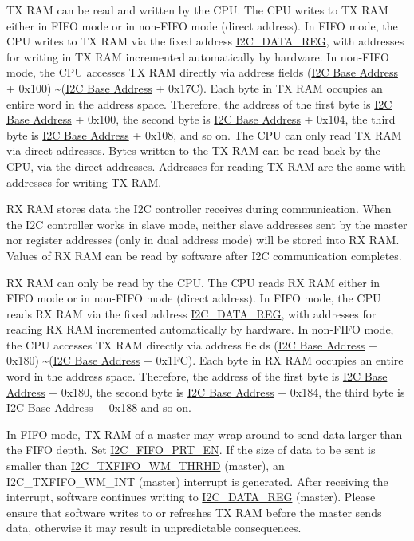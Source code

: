 \documentclass[main\_\_EN.tex]{subfiles}
\begin{document}
TX RAM can be read and written by the CPU. The CPU writes to TX RAM either in FIFO mode or in non-FIFO mode (direct address). In FIFO mode, the CPU writes to TX RAM via the fixed address \hyperref[regdesc:I2CDATAREG]{I2C\_DATA\_REG}, with addresses for writing in TX RAM incremented automatically by hardware. In non-FIFO mode, the CPU accesses TX RAM directly via address fields (\hyperref[tab:sysmem-base-address]{I2C Base Address} + 0x100) \textasciitilde (\hyperref[tab:sysmem-base-address]{I2C Base Address} + 0x17C). Each byte in TX RAM occupies an entire word in the address space. Therefore, the address of the first byte is \hyperref[tab:sysmem-base-address]{I2C Base Address} + 0x100, the second byte is \hyperref[tab:sysmem-base-address]{I2C Base Address} + 0x104, the third byte is \hyperref[tab:sysmem-base-address]{I2C Base Address} + 0x108, and so on. The CPU can only read TX RAM via direct addresses. Bytes written to the TX RAM can be read back by the CPU, via the direct addresses. Addresses for reading TX RAM are the same with addresses for writing TX RAM.

RX RAM stores data the I2C controller receives during communication. When the I2C controller works in slave mode, neither slave addresses sent by the master nor register addresses (only in dual address mode) will be stored into RX RAM. Values of RX RAM can be read by software after I2C communication completes.

RX RAM can only be read by the CPU. The CPU reads RX RAM either in FIFO mode or in non-FIFO mode (direct address). In FIFO mode, the CPU reads RX RAM via the fixed address \hyperref[regdesc:I2CDATAREG]{I2C\_DATA\_REG}, with addresses for reading RX RAM incremented automatically by hardware. In non-FIFO mode, the CPU accesses TX RAM directly via address fields (\hyperref[tab:sysmem-base-address]{I2C Base Address} + 0x180) \textasciitilde (\hyperref[tab:sysmem-base-address]{I2C Base Address} + 0x1FC). Each byte in RX RAM occupies an entire word in the address space. Therefore, the address of the first byte is \hyperref[tab:sysmem-base-address]{I2C Base Address} + 0x180, the second byte is \hyperref[tab:sysmem-base-address]{I2C Base Address} + 0x184, the third byte is \hyperref[tab:sysmem-base-address]{I2C Base Address} + 0x188 and so on.

In FIFO mode, TX RAM of a master may wrap around to send data larger than the FIFO depth. Set \hyperref[fielddesc:I2CFIFOPRTEN]{I2C\_FIFO\_PRT\_EN}. If the size of data to be sent is smaller than \hyperref[fielddesc:I2CTXFIFOWMTHRHD]{I2C\_TXFIFO\_WM\_THRHD} (master), an I2C\_TXFIFO\_WM\_INT (master) interrupt is generated. After receiving the interrupt, software continues writing to \hyperref[regdesc:I2CDATAREG]{I2C\_DATA\_REG} (master). Please ensure that software writes to or refreshes TX RAM before the master sends data, otherwise it may result in unpredictable consequences.
\end{document}
